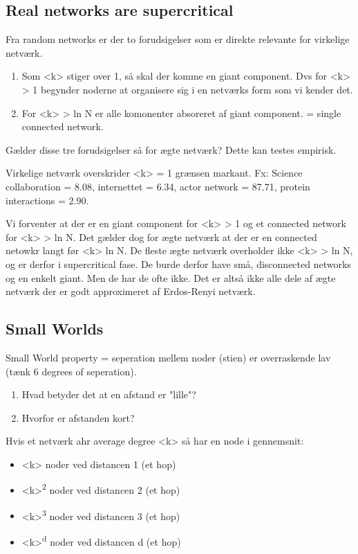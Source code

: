 \documentclass[11pt]{article}
\begin{document}
\subsection{Real networks are supercritical}
\label{sec:org960bada}
Fra random networks er der to forudsigelser som er direkte relevante for virkelige netværk. 

\begin{enumerate}
\item Som <k> stiger over 1, så skal der komme en giant component. Dvs for <k> > 1 begynder noderne at organisere sig i en netværks form som vi kender det.
\item For <k> > ln N er alle komonenter absoreret af giant component. = single connected network.
\end{enumerate}

Gælder disse tre forudsigelser så for ægte netværk? Dette kan testes empirisk.

Virkelige netværk overskrider <k> = 1 grænsen markant. Fx: Science collaboration = 8.08, internettet = 6.34, actor network = 87.71, protein interactions = 2.90. 

Vi forventer at der er en giant component for <k> > 1 og et connected network for <k> > ln N. Det gælder dog for ægte netværk at der er en connected netowkr langt før <k> ln N. De fleste ægte netværk overholder ikke <k> > ln N, og er derfor i supercritical fase. De burde derfor have små, disconnected networks og en enkelt giant. Men de har de ofte ikke. Det er altså ikke alle dele af ægte netværk der er godt approximeret af Erdos-Renyi netværk. 

\subsection{Small Worlds}
\label{sec:org4d83d35}
Small World property = seperation mellem noder (stien) er overraskende lav (tænk 6 degrees of seperation). 
\begin{enumerate}
\item Hvad betyder det at en afstand er "lille"?
\item Hvorfor er afstanden kort?
\end{enumerate}

Hvis et netværk ahr average degree <k> så har en node i gennemsnit:
\begin{itemize}
\item <k> noder ved distancen 1 (et hop)
\item <k>\textsuperscript{2} noder ved distancen 2 (et hop)
\item <k>\textsuperscript{3} noder ved distancen 3 (et hop)
\item <k>\textsuperscript{d} noder ved distancen d (et hop)
\end{itemize}
\end{document}
